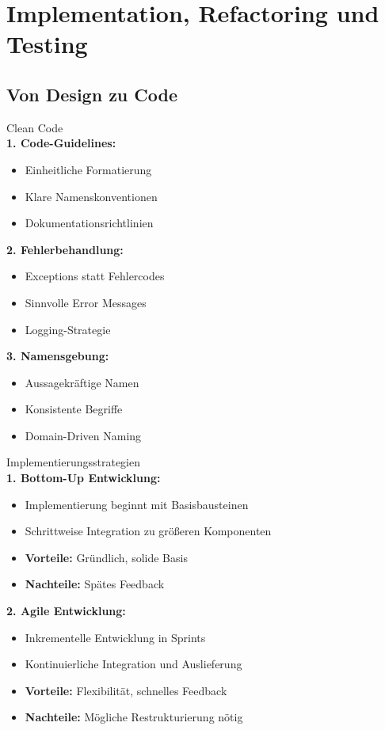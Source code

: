 
\section{Implementation, Refactoring und Testing}

\subsection{Von Design zu Code}

\begin{KR}{Clean Code}\\
\textbf{1. Code-Guidelines:}
\begin{itemize}
    \item Einheitliche Formatierung
    \item Klare Namenskonventionen
    \item Dokumentationsrichtlinien
\end{itemize}

\textbf{2. Fehlerbehandlung:}
\begin{itemize}
    \item Exceptions statt Fehlercodes
    \item Sinnvolle Error Messages
    \item Logging-Strategie
\end{itemize}

\textbf{3. Namensgebung:}
\begin{itemize}
    \item Aussagekräftige Namen
    \item Konsistente Begriffe
    \item Domain-Driven Naming
\end{itemize}
\end{KR}

\begin{concept}{Implementierungsstrategien}\\
\textbf{1. Bottom-Up Entwicklung:}
\begin{itemize}
    \item Implementierung beginnt mit Basisbausteinen
    \item Schrittweise Integration zu größeren Komponenten
    \item \textbf{Vorteile:} Gründlich, solide Basis
    \item \textbf{Nachteile:} Spätes Feedback
\end{itemize}

\textbf{2. Agile Entwicklung:}
\begin{itemize}
    \item Inkrementelle Entwicklung in Sprints
    \item Kontinuierliche Integration und Auslieferung
    \item \textbf{Vorteile:} Flexibilität, schnelles Feedback
    \item \textbf{Nachteile:} Mögliche Restrukturierung nötig
\end{itemize}
\end{concept}

